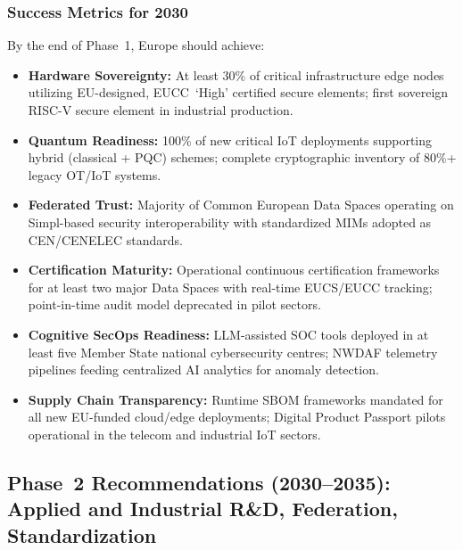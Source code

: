 \subsubsection*{Success Metrics for 2030}
By the end of Phase~1, Europe should achieve:
\begin{itemize}
    \item \textbf{Hardware Sovereignty:}
    At least 30\% of critical infrastructure edge nodes utilizing
    EU-designed, EUCC~`High' certified secure elements; first sovereign
    RISC-V secure element in industrial production.

    \item \textbf{Quantum Readiness:}
    100\% of new critical IoT deployments supporting hybrid (classical
    + PQC) schemes; complete cryptographic inventory of 80\%+ legacy
    OT/IoT systems.

    \item \textbf{Federated Trust:}
    Majority of Common European Data Spaces operating on Simpl-based
    security interoperability with standardized MIMs adopted as
    CEN/CENELEC standards.

    \item \textbf{Certification Maturity:}
    Operational continuous certification frameworks for at least two
    major Data Spaces with real-time EUCS/EUCC tracking; point-in-time
    audit model deprecated in pilot sectors.

    \item \textbf{Cognitive SecOps Readiness:}
    LLM-assisted SOC tools deployed in at least five Member State
    national cybersecurity centres; NWDAF telemetry pipelines feeding
    centralized AI analytics for anomaly detection.

    \item \textbf{Supply Chain Transparency:}
    Runtime SBOM frameworks mandated for all new EU-funded cloud/edge
    deployments; Digital Product Passport pilots operational in the
    telecom and industrial IoT sectors.
\end{itemize}

\subsection*{Phase~2 Recommendations (2030--2035):
             Applied and Industrial R\&D, Federation, Standardization}

